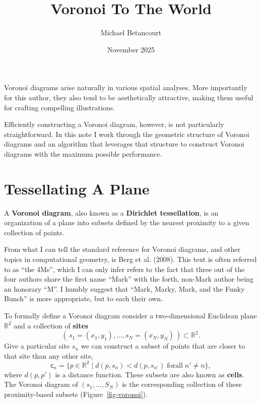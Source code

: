 \documentclass[
  letterpaper,
  DIV=11,
  numbers=noendperiod]{scrartcl}
\title{Voronoi To The World}
\author{Michael Betancourt}
\date{November 2025}
\renewcommand*\contentsname{Table of contents}
\newcommand\contentsname{Table of contents}
\begin{document}
\maketitle

\renewcommand*\contentsname{Table of contents}
{
\hypersetup{linkcolor=}
\setcounter{tocdepth}{3}
\tableofcontents
}
Voronoi diagrams arise naturally in various spatial analyses. More
importantly for this author, they also tend to be aesthetically
attractive, making them useful for crafting compelling illustrations.

Efficiently constructing a Voronoi diagram, however, is not particularly
straightforward. In this note I work through the geometric structure of
Voronoi diagrams and an algorithm that leverages that structure to
construct Voronoi diagrams with the maximum possible performance.

\section{Tessellating A Plane}\label{sec:voronoi-def}

A \textbf{Voronoi diagram}, also known as a \textbf{Dirichlet
tessellation}, is an organization of a plane into subsets defined by the
nearest proximity to a given collection of points.

From what I can tell the standard reference for Voronoi diagrams, and
other topics in computational geometry, is Berg et al. (2008). This text
is often referred to as ``the 4Ms'', which I can only infer refers to
the fact that three out of the four authors share the first name
``Mark'' with the forth, non-Mark author being an honorary ``M''. I
humbly suggest that ``Mark, Marky, Mark, and the Funky Bunch'' is more
appropriate, but to each their own.

To formally define a Voronoi diagram consider a two-dimensional
Euclidean plane \(\mathbb{R}^{2}\) and a collection of \textbf{sites} \[
( \, s_{1} = (x_{1}, y_{1}), \ldots, s_{N} = (x_{N}, y_{N}) \, )
\subset \mathbb{R}^{2}.
\] Give a particular site \(s_{n}\) we can construct a subset of points
that are closer to that site than any other site, \[
\mathsf{c}_{n} =
\{ p \in \mathbb{R}^{2} \mid
d( p, s_{n} ) < d( p, s_{n'} ) \; \mathrm{for all} \; n' \ne n \},
\] where \(d(p, p')\) is a distance function. These subsets are also
known as \textbf{cells}. The Voronoi diagram of
\((s_{1}, \ldots, S_{N})\) is the corresponding collection of these
proximity-based subsets (Figure~\ref{fig-voronoi}).
\end{document}
